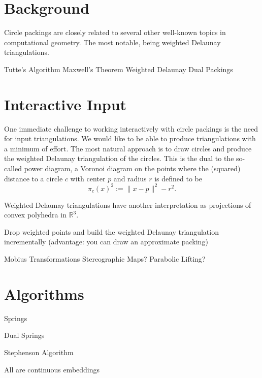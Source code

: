 \documentclass[a4paper,UKenglish]{lipics}
\newcommand{\R}{\mathbb{R}}
\begin{document}

\section{Background} %
\label{sec:background}

  Circle packings are closely related to several other well-known topics in computational geometry.
  The most notable, being weighted Delaunay triangulations.  
  
  Tutte's Algorithm
  Maxwell's Theorem
  Weighted Delaunay
  Dual Packings


\section{Interactive Input} %
\label{sec:interactive_input}

  One immediate challenge to working interactively with circle packings is the need for input triangulations.
  We would like to be able to produce triangulations with a minimum of effort.  
  The most natural approach is to draw circles and produce the weighted Delaunay triangulation of the circles.
  This is the dual to the so-called power diagram, a Voronoi diagram on the points where the (squared) distance to a circle $c$ with center $p$ and radius $r$ is defined to be
  \[
    \pi_c(x)^2 := \|x-p\|^2 - r^2.
  \]
  
  Weighted Delaunay triangulations have another interpretation as projections of convex polyhedra in $\R^3$.

  Drop weighted points and build the weighted Delaunay triangulation incrementally
  (advantage: you can draw an approximate packing)
  
  Mobius Transformations
  Stereographic Maps?
  Parabolic Lifting?
  

\section{Algorithms} %
\label{sec:algorithms}

  Springs
  
  Dual Springs
  
  Stephenson Algorithm
  
  All are continuous embeddings

\end{document}
